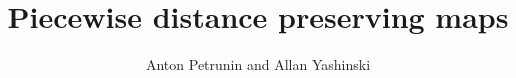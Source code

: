 \documentclass[oneside,a4paper]{article}
\begin{document}
\title{Piecewise distance preserving maps}
\author{Anton Petrunin and Allan Yashinski}
\date{}
\maketitle



\end{document}
